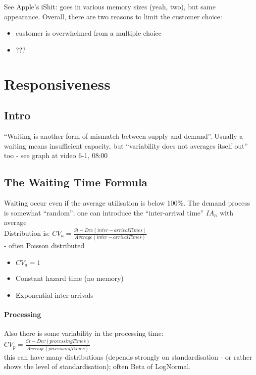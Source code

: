 \documentclass{scrartcl}
\begin{document}
See Apple's iShit: goes in various memory sizes (yeah, two), but same appearance. Overall, there are two reasons to limit the customer choice:
\begin{itemize}
\item customer is overwhelmed from a multiple choice
\item ???
\end{itemize}

\section{Responsiveness}
\label{sec:sec06}

\subsection{Intro}
\label{sec:sec06-01}

``Waiting is another form of mismatch between supply and demand''. Usually a waiting means insufficient capacity, but ``variability does not averages itself out'' too - see graph at video 6-1, 08:00

\subsection{The Waiting Time Formula}
\label{sec:06-02}

Waiting occur even if the average utilisation is below 100\%. The demand process is somewhat ``random''; one can introduce the ``inter-arrival time'' $IA_n$ with average \\
Distribution is: $CV_a = \frac{St-Dev(inter-arrivalTimes)}{Average(inter-arrivalTimes)}$\\
- often Poisson distributed
\begin{itemize}
\item $CV_a = 1$
\item Constant hazard time (no memory)
\item Exponential inter-arrivals
\end{itemize}

\paragraph{Processing}

Also there is some variability in the processing time:\\
$CV_p = \frac{Ct-Dev(processingTimes)}{Average(processingTimes)}$ \\
this can have many distributions (depends strongly on standardisation - or rather shows the level of standardisation); often Beta of LogNormal.
\end{document}
